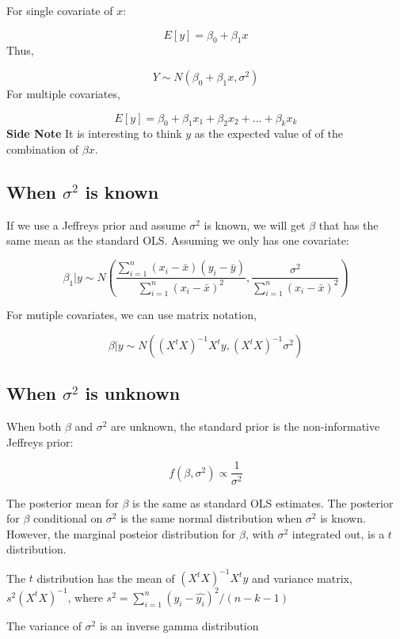 \documentclass[
]{book}
\begin{document}
For single covariate of \(x\):

\[E[y]=\beta_0+\beta_1 x\]
Thus,

\[Y \sim N(\beta_0+\beta_1 x, \sigma^2)\]
For multiple covariates,

\[E[y]=\beta_0+\beta_1 x_1+\beta_2 x_2 + ...+ \beta_kx_k\]
\textbf{Side Note}
It is interesting to think \(y\) as the expected value of of the combination of \(\beta x\).

\hypertarget{when-sigma2-is-known}{%
\subsection{\texorpdfstring{When \(\sigma^2\) is known}{When \textbackslash sigma\^{}2 is known}}\label{when-sigma2-is-known}}

If we use a Jeffreys prior and assume \(\sigma^2\) is known, we will get \(\beta\) that has the same mean as the standard OLS. Assuming we only has one covariate:

\[\beta_1|y \sim N(\frac{\sum_{i=1}^n (x_i-\bar{x})(y_i-\bar{y})}{\sum_{i=1}^n(x_i-\bar{x})^2},\frac{\sigma^2}{\sum_{i=1}^n(x_i-\bar{x})^2})\]

For mutiple covariates, we can use matrix notation,

\[\beta|y \sim N((X^tX)^{-1}X^ty,(X^tX)^{-1}\sigma^2)\]

\hypertarget{when-sigma2-is-unknown}{%
\subsection{\texorpdfstring{When \(\sigma^2\) is unknown}{When \textbackslash sigma\^{}2 is unknown}}\label{when-sigma2-is-unknown}}

When both \(\beta\) and \(\sigma^2\) are unknown, the standard prior is the non-informative Jeffreys prior:

\[f(\beta, \sigma^2) \propto \frac{1}{\sigma^2}\]

The posterior mean for \(\beta\) is the same as standard OLS estimates. The posterior for \(\beta\) conditional on \(\sigma^2\) is the same normal distribution when \(\sigma^2\) is known. However, the marginal posteior distribution for \(\beta\), with \(\sigma^2\) integrated out, is a \(t\) distribution.

The \(t\) distribution has the mean of \((X^tX)^{-1}X^ty\) and variance matrix, \(s^2(X^tX)^{-1}\), where \(s^2=\sum_{i=1}^n(y_i-\hat{y_i})^2/(n-k-1)\)

The variance of \(\sigma^2\) is an inverse gamma distribution
\end{document}
